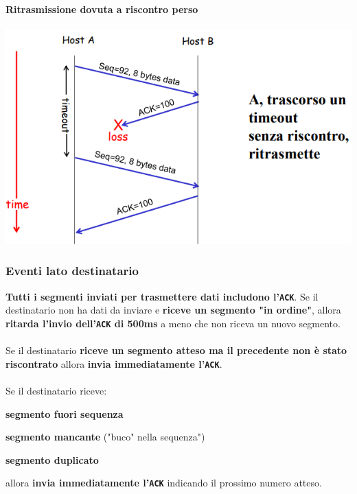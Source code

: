 \documentclass[10pt]{article}
\begin{document}
\paragraph{Ritrasmissione dovuta a riscontro perso}
\begin{center}
\includegraphics[scale=0.7]{tcplostack.png}
\end{center}
\subsubsection{Eventi lato destinatario}
\textbf{Tutti i segmenti inviati per trasmettere dati includono l'\texttt{ACK}}. Se il destinatario non ha dati da inviare e \textbf{riceve un segmento "in ordine"}, allora \textbf{ritarda l'invio dell'\texttt{ACK} di 500ms} a meno che non riceva un nuovo segmento.\\\\
Se il destinatario \textbf{riceve un segmento atteso ma il precedente non è stato riscontrato} allora \textbf{invia immediatamente l'\texttt{ACK}}.\\\\
Se il destinatario riceve:
\begin{list}{}{}
\item \textbf{segmento fuori sequenza}
\item \textbf{segmento mancante} ("buco" nella sequenza")
\item \textbf{segmento duplicato}
\end{list}
allora \textbf{invia immediatamente l'\texttt{ACK}} indicando il prossimo numero atteso.
\end{document}

